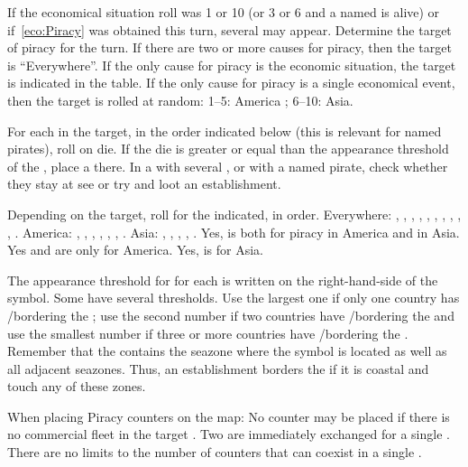 \aparag If the economical situation roll was 1 or 10 (or 3 or 6 and a
named  \LeaderA is alive) or if~\ref{eco:Piracy} was
obtained this turn, several \PIRATE may appear. Determine the target of
piracy for the turn.
\bparag If there are two or more causes for piracy, then the target is
``Everywhere''.
\bparag If the only cause for piracy is the economic situation, the
target is indicated in the table.
\bparag If the only cause for piracy is a single economical event, then
the target is rolled at random: 1--5: America ; 6--10: Asia.

\aparag For each \STZ in the target, in the order indicated below (this
is relevant for named pirates), roll on die. If the die is greater or
equal than the appearance threshold of the \STZ, place a
\PIRATE\facemoins there.
\bparag In a \STZ with several \PIRATE\faceplus, or with a named pirate,
check whether they stay at see or try and loot an establishment.

 Depending on the target, roll for the \STZ
indicated, in order.
\bparag Everywhere: , , ,
, , , , ,
, , .
\bparag America: , , ,
, , , .
\bparag Asia: , , , ,
.
\bparag Yes,  is both for piracy in America and in
Asia. Yes  and  are only for America. Yes,
 is for Asia.

\label{chEvents:Piracy Level}
The appearance threshold for \PIRATE for each \ROTW \STZ is written on
the right-hand-side of the \STZ symbol.
\bparag Some \STZ have several thresholds. Use the largest one if only
one country has \COL/\TP bordering the \STZ; use the second number if
two countries have \COL/\TP bordering the \STZ and use the smallest
number if three or more countries have \COL/\TP bordering the \STZ.
\bparag Remember that the \STZ contains the seazone where the symbol is
located as well as all adjacent seazones. Thus, an establishment borders
the \STZ if it is coastal and touch any of these zones.

 \label{chEvents:PiracyPlacement} When placing
Piracy counters on the map:
\bparag No \PIRATE counter may be placed if there is no commercial fleet
in the target \STZ.
\bparag Two \PIRATE\facemoins are immediately exchanged for a single
\PIRATE\faceplus.
\bparag There are no limits to the number of \corsaire counters that can
coexist in a single \STZ.



